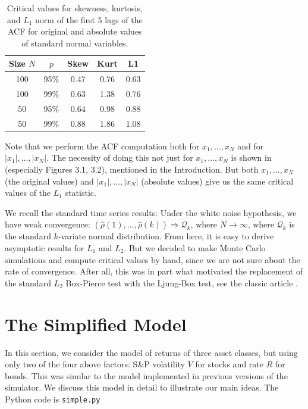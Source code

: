 \documentclass[12pt]{amsart}
\begin{document}
\begin{table}[h]
\centering
\begin{tabular}{|ccccc|}
\hline
Size $N$ & $p$ & Skew & Kurt & L1 \\
\hline
100 & 95\% & 0.47 & 0.76 & 0.63 \\
100 & 99\% & 0.63 & 1.38 & 0.76 \\
50 & 95\% & 0.64 & 0.98 & 0.88 \\
50 & 99\% & 0.88 & 1.86 & 1.08 \\
\hline
\end{tabular}
\caption{Critical values for skewness, kurtosis, and $L_1$ norm of the first 5 lags of the ACF for original and absolute values of standard normal variables.}
\label{table:values}
\end{table}

Note that we perform the ACF computation both for $x_1, \ldots, x_N$ and for $|x_1|, \ldots, |x_N|$. The necessity of doing this not just for $x_1, \ldots, x_N$ is shown in  \cite[Chapter 3, Section 1]{Textbook} (especially Figures 3.1, 3.2), mentioned in the Introduction.  But both $x_1, \ldots, x_N$ (the original values) and $|x_1|, \ldots, |x_N|$ (absolute values) give us the same critical values of the $L_1$ statistic.

We recall the standard time series results: Under the white noise hypothesis, we have weak convergence:
$(\hat{\rho}(1), \ldots, \hat{\rho}(k)) \Rightarrow \mathcal Q_k$, where $N \to \infty$, where $\mathcal Q_k$ is the standard $k$-variate normal distribution. From here, it is easy to derive asymptotic results for $L_1$ and $L_2$. But we decided to make Monte Carlo simulations and compute critical values by hand, since we are not sure about the rate of convergence. After all, this was in part what motivated the replacement of the standard $L_2$ Box-Pierce test with the Ljung-Box test, see the classic article \cite{Ljung}.


\section{The Simplified Model}

In this section, we consider the model of returns of three asset classes, but using only two of the four above factors: S\&P volatility $V$ for stocks and rate $R$ for bonds. This was similar to the model implemented in previous versions of the simulator. We discuss this model in detail to illustrate our main ideas. The Python code is \texttt{simple.py} 
\end{document}
